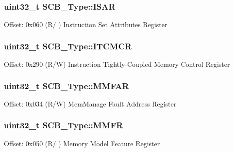 \subsubsection[{\texorpdfstring{I\+S\+AR}{ISAR}}]{ uint32\+\_\+t S\+C\+B\+\_\+\+Type\+::\+I\+S\+AR}\hypertarget{structSCB__Type_a84715ecbe885efa4841d594e7409ccae}{}\label{structSCB__Type_a84715ecbe885efa4841d594e7409ccae}
Offset\+: 0x060 (R/ ) Instruction Set Attributes Register 
\subsubsection[{\texorpdfstring{I\+T\+C\+M\+CR}{ITCMCR}}]{ uint32\+\_\+t S\+C\+B\+\_\+\+Type\+::\+I\+T\+C\+M\+CR}\hypertarget{structSCB__Type_a6f52bb11b40cad59e836366a43686d63}{}\label{structSCB__Type_a6f52bb11b40cad59e836366a43686d63}
Offset\+: 0x290 (R/W) Instruction Tightly-\/\+Coupled Memory Control Register 
\subsubsection[{\texorpdfstring{M\+M\+F\+AR}{MMFAR}}]{ uint32\+\_\+t S\+C\+B\+\_\+\+Type\+::\+M\+M\+F\+AR}\hypertarget{structSCB__Type_ac49b24b3f222508464f111772f2c44dd}{}\label{structSCB__Type_ac49b24b3f222508464f111772f2c44dd}
Offset\+: 0x034 (R/W) Mem\+Manage Fault Address Register 
\subsubsection[{\texorpdfstring{M\+M\+FR}{MMFR}}]{ uint32\+\_\+t S\+C\+B\+\_\+\+Type\+::\+M\+M\+FR}\hypertarget{structSCB__Type_a40b4fec8c296cba02baec983378cbcfd}{}\label{structSCB__Type_a40b4fec8c296cba02baec983378cbcfd}
Offset\+: 0x050 (R/ ) Memory Model Feature Register 
